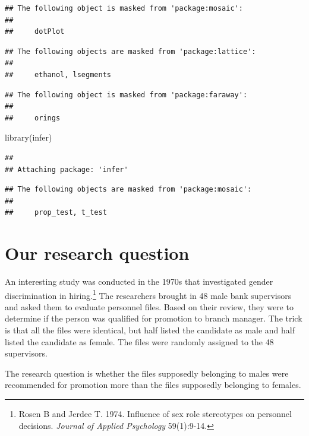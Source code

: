 \documentclass[
]{book}
\newenvironment{Shaded}{\begin{snugshade}}{\end{snugshade}}
\newcommand{\FunctionTok}[1]{\textcolor[rgb]{0.00,0.00,0.00}{#1}}
\newcommand{\NormalTok}[1]{#1}
\begin{document}
\begin{verbatim}
## The following object is masked from 'package:mosaic':
## 
##     dotPlot
\end{verbatim}

\begin{verbatim}
## The following objects are masked from 'package:lattice':
## 
##     ethanol, lsegments
\end{verbatim}

\begin{verbatim}
## The following object is masked from 'package:faraway':
## 
##     orings
\end{verbatim}

\begin{Shaded}
\begin{Highlighting}[]
\FunctionTok{library}\NormalTok{(infer)}
\end{Highlighting}
\end{Shaded}

\begin{verbatim}
## 
## Attaching package: 'infer'
\end{verbatim}

\begin{verbatim}
## The following objects are masked from 'package:mosaic':
## 
##     prop_test, t_test
\end{verbatim}

\hypertarget{randomization2-question}{%
\section{Our research question}\label{randomization2-question}}

An interesting study was conducted in the 1970s that investigated gender discrimination in hiring.\footnote{Rosen B and Jerdee T. 1974. Influence of sex role stereotypes on personnel decisions. \emph{Journal of Applied Psychology} 59(1):9-14.} The researchers brought in 48 male bank supervisors and asked them to evaluate personnel files. Based on their review, they were to determine if the person was qualified for promotion to branch manager. The trick is that all the files were identical, but half listed the candidate as male and half listed the candidate as female. The files were randomly assigned to the 48 supervisors.

The research question is whether the files supposedly belonging to males were recommended for promotion more than the files supposedly belonging to females.
\end{document}
